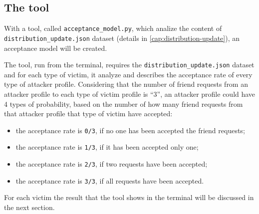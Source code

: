 \subsection{The tool}
\label{cap:model-of-acceptance}
With a tool, called \texttt{acceptance\_model.py}, which analize the content of \\ \texttt{distribution\_update.json} dataset (details in \ref{cap:distribution-update}), an acceptance model will be created.
\par \noindent
The tool, run from the terminal, requires the \texttt{distribution\_update.json} dataset and for each type of victim, it analyze and describes the acceptance rate of every type of attacker profile. Considering that the number of friend requests from an attacker profile to each type of victim profile is ``3'', an attacker profile could have 4 types of probability, based on the number of how many friend requests from that attacker profile that type of victim have accepted:
\begin{itemize}
	\item the acceptance rate is \texttt{0/3}, if no one has been accepted the friend requests;
	\item the acceptance rate is \texttt{1/3}, if it has been accepted only one;
	\item the acceptance rate is \texttt{2/3}, if two requests have been accepted;
	\item the acceptance rate is \texttt{3/3}, if all requests have been accepted.
\end{itemize}
For each victim the result that the tool shows in the terminal will be discussed in the next section.
